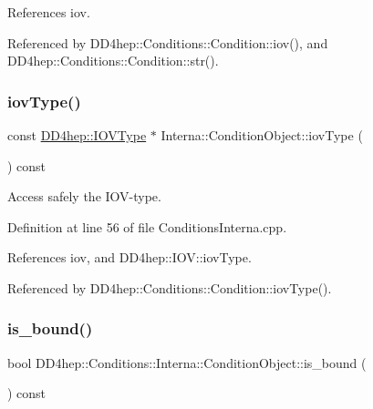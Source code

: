 References iov.



Referenced by D\+D4hep\+::\+Conditions\+::\+Condition\+::iov(), and D\+D4hep\+::\+Conditions\+::\+Condition\+::str().

\hypertarget{class_d_d4hep_1_1_conditions_1_1_interna_1_1_condition_object_aebf1262e5b6ee98acedc8a6481a826ba}{}\label{class_d_d4hep_1_1_conditions_1_1_interna_1_1_condition_object_aebf1262e5b6ee98acedc8a6481a826ba} 
\subsubsection{\texorpdfstring{iov\+Type()}{iovType()}}
{\footnotesize\ttfamily const \hyperlink{class_d_d4hep_1_1_i_o_v_type}{D\+D4hep\+::\+I\+O\+V\+Type} $\ast$ Interna\+::\+Condition\+Object\+::iov\+Type (\begin{DoxyParamCaption}{ }\end{DoxyParamCaption}) const}



Access safely the I\+O\+V-\/type. 



Definition at line 56 of file Conditions\+Interna.\+cpp.



References iov, and D\+D4hep\+::\+I\+O\+V\+::iov\+Type.



Referenced by D\+D4hep\+::\+Conditions\+::\+Condition\+::iov\+Type().

\hypertarget{class_d_d4hep_1_1_conditions_1_1_interna_1_1_condition_object_a51dd6a1ebeb160b7a3d1346e07fbcf9e}{}\label{class_d_d4hep_1_1_conditions_1_1_interna_1_1_condition_object_a51dd6a1ebeb160b7a3d1346e07fbcf9e} 
\subsubsection{\texorpdfstring{is\+\_\+bound()}{is\_bound()}}
{\footnotesize\ttfamily bool D\+D4hep\+::\+Conditions\+::\+Interna\+::\+Condition\+Object\+::is\+\_\+bound (\begin{DoxyParamCaption}{ }\end{DoxyParamCaption}) const\hspace{0.3cm}{\ttfamily [inline]}}




